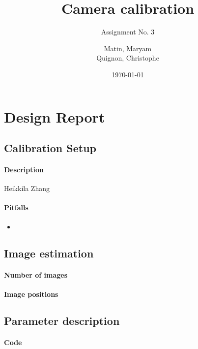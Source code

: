 \documentclass{scrartcl}
\begin{document}
\title{Camera calibration}
\subtitle{Assignment No. 3}
\author{
  Matin, Maryam \\
  Quignon, Christophe
}
\date{\today}


\maketitle


\section{Design Report}

\subsection{Calibration Setup}
\paragraph{Description}
Heikkila\cite{heikkila}
Zhang\cite{zhang}

\paragraph{Pitfalls}
\begin{itemize}
\item 
\end{itemize}


\subsection{Image estimation}
\paragraph{Number of images}

\paragraph{Image positions}


\subsection{Parameter description}
\paragraph{Code}

\end{document}

